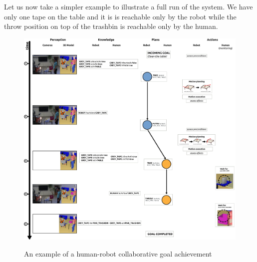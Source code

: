 \documentclass[preprint,5p]{elsarticle}
\begin{document}
Let us now take a simpler example to illustrate a full run of the
system. We have only one tape on the table and it is is reachable only
by the robot while the throw position on top of the trashbin is
reachable only by the human.

\begin{figure}[thpb]
  \centering
    \includegraphics[width=1.0\textwidth]{./figs/manip_run.pdf} \\
    \begin{center}
    \caption {An example of a human-robot collaborative goal achievement}
    \end{center}
  \label{manip_run_fg}
\end{figure}


\end{document}
